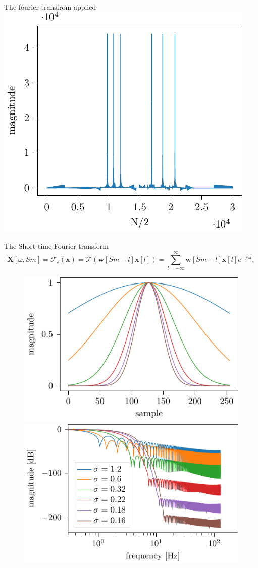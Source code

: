 \documentclass[xcolor=dvipsnames]{beamer}
\begin{document}
\begin{frame}{The fourier transfrom applied}
\centering
\includegraphics[width=.6\linewidth]{plots/fft.pdf}
\end{frame}


\begin{frame}{The Short time Fourier transform}
\begin{equation}
    \mathbf{X} [\omega, Sm] 
    = \mathcal{F}_s\left(\mathbf{x}\right) = \mathcal{F}\left(\mathbf{w}[Sm - l]\mathbf{x}[l]\right) = \sum_{l = -\infty}^{\infty} \mathbf{w}[Sm - l]\mathbf{x}[l]e^{-j\omega l},
    \label{eq:STFT}
\end{equation}
\begin{figure}
    \centering
    \includegraphics[width=0.49\linewidth]{./img/gaussian_window_sigma_plot.pdf}
    \includegraphics[width=0.49\linewidth]{./img/gaussian_window_sigma_freq_plot.pdf}
\end{figure}
\end{frame}
\end{document}
